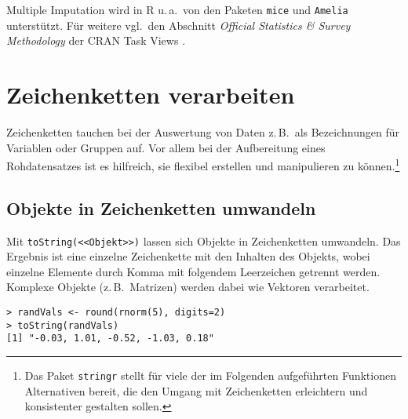 Multiple Imputation wird in R u.\,a.\ von den Paketen \lstinline!mice! \cite{vanBuuren2011,vanBuuren2012} und  \lstinline!Amelia! \cite{Honaker2011} unterstützt. Für weitere vgl.\ den Abschnitt \emph{Official Statistics \& Survey Methodology} der CRAN Task Views \cite{CRANtvOffStat}.

\section{Zeichenketten verarbeiten}
\label{sec:stringMan}

Zeichenketten tauchen bei der Auswertung von Daten z.\,B.\ als Bezeichnungen für Variablen oder Gruppen auf. Vor allem bei der Aufbereitung eines Rohdatensatzes ist es hilfreich, sie flexibel erstellen und manipulieren zu können.\footnote{Das Paket  \lstinline!stringr! \cite{Wickham2011a} stellt für viele der im Folgenden aufgeführten Funktionen Alternativen bereit, die den Umgang mit Zeichenketten erleichtern und konsistenter gestalten sollen.}

\subsection{Objekte in Zeichenketten umwandeln}
\label{sec:sink}

Mit \lstinline!toString(<<Objekt>>)! lassen sich Objekte in Zeichenketten umwandeln. Das Ergebnis ist eine einzelne Zeichenkette mit den Inhalten des Objekts, wobei einzelne Elemente durch Komma mit folgendem Leerzeichen getrennt werden. Komplexe Objekte (z.\,B.\ Matrizen) werden dabei wie Vektoren verarbeitet.
\begin{lstlisting}
> randVals <- round(rnorm(5), digits=2)
> toString(randVals)
[1] "-0.03, 1.01, -0.52, -1.03, 0.18"
\end{lstlisting}

